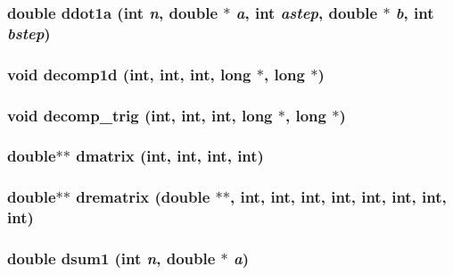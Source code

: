 \subsubsection{\setlength{\rightskip}{0pt plus 5cm}double ddot1a (int {\em n}, double $\ast$ {\em a}, int {\em astep}, double $\ast$ {\em b}, int {\em bstep})}\label{proto__utils_8h_2e4408dba3a60d5cfa61bf07c935c049}


\subsubsection{\setlength{\rightskip}{0pt plus 5cm}void decomp1d (int, int, int, long $\ast$, long $\ast$)}\label{proto__utils_8h_04dafeed4f1598249408e457c38a0b6e}


\subsubsection{\setlength{\rightskip}{0pt plus 5cm}void decomp\_\-trig (int, int, int, long $\ast$, long $\ast$)}\label{proto__utils_8h_867d5b76e8e954b8a2ea3df503e63040}


\subsubsection{\setlength{\rightskip}{0pt plus 5cm}double$\ast$$\ast$ dmatrix (int, int, int, int)}\label{proto__utils_8h_1ccaf1ced1551855c51abb0c1f29a2bb}


\subsubsection{\setlength{\rightskip}{0pt plus 5cm}double$\ast$$\ast$ drematrix (double $\ast$$\ast$, int, int, int, int, int, int, int, int)}\label{proto__utils_8h_1adb38d0d9128734dc80cc96a8e2b5e8}


\subsubsection{\setlength{\rightskip}{0pt plus 5cm}double dsum1 (int {\em n}, double $\ast$ {\em a})}\label{proto__utils_8h_37015c4294d61ebff20245e3ff83638d}


